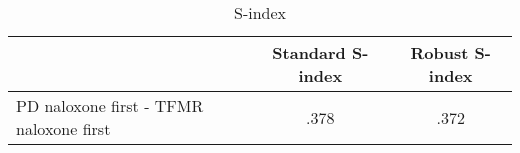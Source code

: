 \begin{table}[htbp] \centering
\def\sym#1{\ifmmode^{#1}\else\(^{#1}\)\fi}
  \caption{S-index} %
  \begin{adjustbox}{max width=\linewidth}\begin{tabular}{l*{2}{c}}
    \toprule
     & Standard S-index & Robust S-index \\ 
    \midrule
    PD naloxone first - TFMR naloxone first & .378 & .372\\ 
    \bottomrule
  \end{tabular} \end{adjustbox}
\end{table}